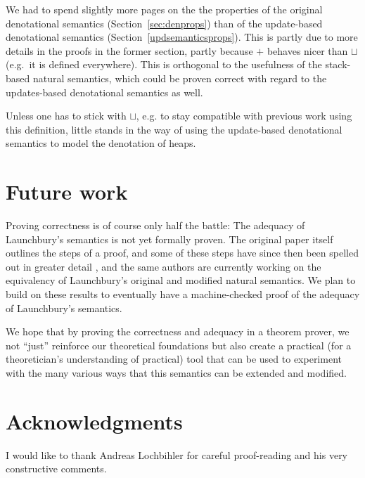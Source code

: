\documentclass{jfp1}
\theoremstyle{nonumberbreak}
\begin{document}
We had to spend slightly more pages on the the properties of the original denotational semantics (Section~\ref{sec:denprops}) than of the update-based denotational semantics (Section~\ref{updsemanticsprops}). This is partly due to more details in the proofs in the former section, partly because $+$ behaves nicer than $\sqcup$ (e.g.\ it is defined everywhere). This is orthogonal to the usefulness of the stack-based natural semantics, which could be proven correct with regard to the updates-based denotational semantics as well.

Unless one has to stick with $\sqcup$, e.g. to stay compatible with previous work using this definition, little stands in the way of using the update-based denotational semantics to model the denotation of heaps.

\section{Future work}

Proving correctness is of course only half the battle: The adequacy of Launchbury’s semantics is not yet formally proven. The original paper itself outlines the steps of a proof, and some of these steps have since then been spelled out in greater detail \cite{functionspaces}, and the same authors are currently working on the equivalency of Launchbury’s original and modified natural semantics. We plan to build on these results to eventually have a machine-checked proof of the adequacy of Launchbury’s semantics.

We hope that by proving the correctness and adequacy in a theorem prover, we not “just” reinforce our theoretical foundations but also create a practical (for a theoretician’s understanding of practical) tool that can be used to experiment with the many various ways that this semantics can be extended and modified.

\section*{Acknowledgments}

I would like to thank Andreas Lochbihler for careful proof-reading and his very constructive comments.



\end{document}
